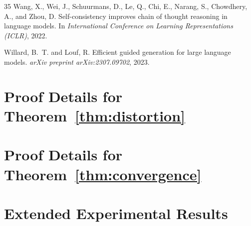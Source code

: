 \documentclass[twoside,11pt]{article}
\begin{document}
\begin{thebibliography}{35}
Wang, X., Wei, J., Schuurmans, D., Le, Q., Chi, E., Narang, S.,
Chowdhery, A., and Zhou, D.
\newblock Self-consistency improves chain of thought reasoning in language
models.
\newblock In \emph{International Conference on Learning Representations
(ICLR)}, 2022.

Willard, B.~T. and Louf, R.
\newblock Efficient guided generation for large language models.
\newblock \emph{arXiv preprint arXiv:2307.09702}, 2023.

\end{thebibliography}

\appendix

\section{Proof Details for Theorem~\ref{thm:distortion}}
\label{app:distortion-proof}


\section{Proof Details for Theorem~\ref{thm:convergence}}
\label{app:convergence-proof}


\section{Extended Experimental Results}
\label{app:extended-results}

\end{document}
